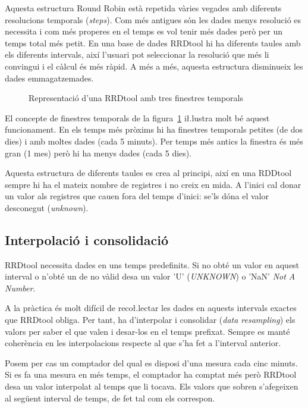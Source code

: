 Aquesta estructura Round Robin està repetida vàries vegades amb diferents resolucions temporals (\emph{steps}). Com més antigues són les dades  menys resolució es necessita i com més properes en el temps es vol tenir més dades però per un temps total més petit. En una base de dades RRDtool hi ha diferents taules amb els diferents intervals, així l'usuari pot seleccionar la resolució que més li convingui i el càlcul és més ràpid. A més a més, aquesta estructura disminueix les dades emmagatzemades. 


\begin{figure}[htb]
  
    \caption{Representació d'una RRDtool amb tres finestres temporals}
    \label{temporal_RRD}
\end{figure}

El concepte de finestres temporals de la figura~\ref{temporal_RRD} i\l.lustra molt bé aquest funcionament.
En els temps més pròxims hi ha finestres temporals petites (de dos dies) i amb moltes dades (cada 5 minuts). Per temps més antics la finestra és més gran (1 mes) però hi ha menys dades (cada 5 dies). 

Aquesta estructura de diferents taules es crea al principi, així en una RDDtool sempre hi ha el mateix nombre de registres i no creix en mida. A l'inici cal donar un valor als registres que cauen fora del temps d'inici: se'ls dóna el valor desconegut (\emph{unknown}).


\subsection{Interpolació i consolidació}\label{interpolacio}

RRDtool necessita dades en uns temps predefinits. Si no obté un valor en aquest interval o n'obté un de no vàlid desa un valor 'U' (\emph{UNKNOWN}) o 'NaN' \emph{Not A Number}.

A la pràctica és molt difícil de reco\l.lectar les dades en aquests intervals exactes que RRDtool obliga. Per tant, ha d'interpolar i consolidar (\emph{data resampling}) els valors per saber el que valen i desar-los en el temps prefixat. Sempre es manté coherència en les interpolacions respecte al que s'ha fet a l'interval anterior.

Posem per cas un comptador del qual es disposi d'una mesura cada cinc minuts. Si es fa una mesura en més temps, el comptador ha comptat més però RRDtool desa un valor interpolat al temps que li tocava. Els valors que sobren s'afegeixen al següent interval de temps, de fet tal com els correspon.


